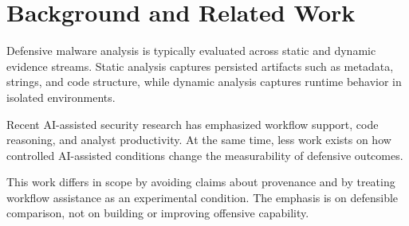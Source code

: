 \section{Background and Related Work}



Defensive malware analysis is typically evaluated across static and dynamic evidence streams.
Static analysis captures persisted artifacts such as metadata, strings, and code structure, while
dynamic analysis captures runtime behavior in isolated environments.

Recent AI-assisted security research has emphasized workflow support, code reasoning,
and analyst productivity. At the same time, less work exists on how controlled AI-assisted
conditions change the measurability of defensive outcomes.

This work differs in scope by avoiding claims about provenance and by treating workflow
assistance as an experimental condition. The emphasis is on defensible comparison, not on
building or improving offensive capability.
